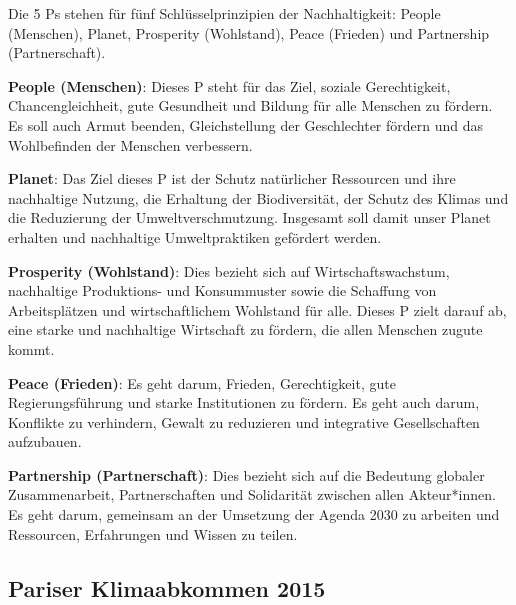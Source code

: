 \documentclass[
  nswissgerman,
  a4paper,
  DIV=11,
  numbers=noendperiod,
  oneside,
  openany]{scrreprt}
\begin{document}
\begin{tcolorbox}[enhanced jigsaw, arc=.35mm, bottomrule=.15mm, bottomtitle=1mm, breakable, colback=white, colbacktitle=quarto-callout-note-color!10!white, colframe=quarto-callout-note-color-frame, coltitle=black, left=2mm, leftrule=.75mm, opacityback=0, opacitybacktitle=0.6, rightrule=.15mm, title={Die 5 Ps der SDGs}, titlerule=0mm, toprule=.15mm, toptitle=1mm]

Die 5 Ps stehen für fünf Schlüsselprinzipien der Nachhaltigkeit: People
(Menschen), Planet, Prosperity (Wohlstand), Peace (Frieden) und
Partnership (Partnerschaft).

\textbf{People (Menschen)}: Dieses P steht für das Ziel, soziale
Gerechtigkeit, Chancengleichheit, gute Gesundheit und Bildung für alle
Menschen zu fördern. Es soll auch Armut beenden, Gleichstellung der
Geschlechter fördern und das Wohlbefinden der Menschen verbessern.

\textbf{Planet}: Das Ziel dieses P ist der Schutz natürlicher Ressourcen
und ihre nachhaltige Nutzung, die Erhaltung der Biodiversität, der
Schutz des Klimas und die Reduzierung der Umweltverschmutzung. Insgesamt
soll damit unser Planet erhalten und nachhaltige Umweltpraktiken
gefördert werden.

\textbf{Prosperity (Wohlstand)}: Dies bezieht sich auf
Wirtschaftswachstum, nachhaltige Produktions- und Konsummuster sowie die
Schaffung von Arbeitsplätzen und wirtschaftlichem Wohlstand für alle.
Dieses P zielt darauf ab, eine starke und nachhaltige Wirtschaft zu
fördern, die allen Menschen zugute kommt.

\textbf{Peace (Frieden)}: Es geht darum, Frieden, Gerechtigkeit, gute
Regierungsführung und starke Institutionen zu fördern. Es geht auch
darum, Konflikte zu verhindern, Gewalt zu reduzieren und integrative
Gesellschaften aufzubauen.

\textbf{Partnership (Partnerschaft)}: Dies bezieht sich auf die
Bedeutung globaler Zusammenarbeit, Partnerschaften und Solidarität
zwischen allen Akteur*innen. Es geht darum, gemeinsam an der Umsetzung
der Agenda 2030 zu arbeiten und Ressourcen, Erfahrungen und Wissen zu
teilen.

\end{tcolorbox}

\subsection{Pariser Klimaabkommen
2015}\label{pariser-klimaabkommen-2015}
\end{document}

